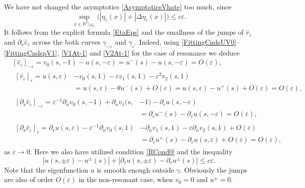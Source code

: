 \documentclass[reqno]{amsart}
\theoremstyle{plain}
\numberwithin{equation}{section}
\newcommand{\Real}{\mathbb R}
\newcommand{\eps}{\varepsilon}
\renewcommand{\leq}{\leqslant}
\begin{document}
We have not changed the asymptotics \eqref{AsymptoticsVhate} too much, since
\begin{equation}\label{EtaEpsEstimate}
  \sup_{x\in \Real^2\setminus \omega_\eps}\big(|\eta_\eps(x)|+|\Delta\eta_\eps(x)|\big)\leq c\eps.
\end{equation}
It follows from the explicit formula \eqref{EtaEps} and the smallness of
the jumps of $\hat{v}_\eps$ and $\partial_\nu\hat{v}_\eps$ across the both curves $\gamma_{-\eps}$ and $\gamma_{\eps}$. Indeed,
using \eqref{FittingCndsUV0}--\eqref{FittingCndspV1}, \eqref{V1At-1} and \eqref{V2At-1} for the case of resonance we deduce
 \begin{align*}{}
  &[\hat{v}_\eps]_{-\eps}=v_0(s,-1)-u(s,-\eps)
                  =u^-(s)-u(s,-\eps)=O(\eps),
  \\
  &\begin{aligned}{}
  [\hat{v}_\eps]_{\eps}=u(s,\eps)&-v_0(s,1)-\eps v_1(s,1)-\eps^2 v_2(s,1)\\
                  &=u(s,\eps)-\theta u^-(s)+O(\eps)
=u(s,\eps)-u^+(s)+O(\eps)=O(\eps),
   \end{aligned}
   \\
   &\begin{aligned}{}
  [\partial_\nu\hat{v}_\eps]_{-\eps}=\eps^{-1}\partial_n v_0(s,-1)+\partial_n v_1(s,&-1)-\partial_r u(s,-\eps)
                  \\
  &=\partial_r u^-(s)-\partial_r u(s,-\eps)=O(\eps),
   \end{aligned}
   \\
    &\begin{aligned}{}
  [\partial_\nu\hat{v}_\eps]_{\eps}=\partial_r u(s,\eps)-\eps^{-1}\partial_n v_0(s,1)&-\partial_nv_1(s,1)-\eps\partial_n v_2(s,1)+O(\eps)
                  \\
  &=\partial_r u^+(s)-\partial_r u(s,\eps)+O(\eps)=O(\eps),
   \end{aligned}
 \end{align*}
as $\eps\to 0$. Here we also have utilized  condition \eqref{RCond0} and the  inequality
\begin{equation*}
|u(s,\pm \eps)-u^\pm(s)|+|\partial_ru(s,\pm \eps)
-\partial_r u^\pm(s)|\leq c\eps.
\end{equation*}
Note that the eigenfunction $u$ is smooth enough outside $\gamma$.
Obviously the jumps are also of order $O(\eps)$ in the non-resonant case,
when $v_0=0$ and $u^\pm=0$.
\end{document}
